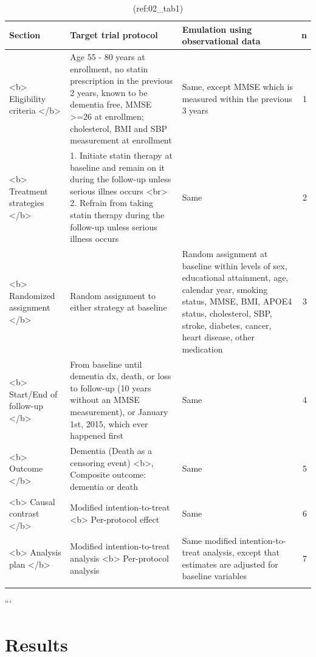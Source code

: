 \documentclass[
]{book}
\begin{document}
\begin{longtable}[t]{lllr}
\caption{\label{tab:unnamed-chunk-1}(ref:02_tab1)}\\
\toprule{}
Section & Target trial protocol & Emulation using observational data & n\\
\midrule{}
<b> Eligibility criteria </b> & Age 55 - 80 years at enrollment, no statin prescription in the previous 2 years, known to be dementia free, MMSE >=26 at enrollmen; cholesterol, BMI and SBP measurement at enrollment & Same, except MMSE which is measured within the previous 3 years & 1\\
<b> Treatment strategies  </b> & 1. Initiate statin therapy at baseline and remain on it during the follow-up unless serious illnes occurs <br>
     2. Refrain from taking statin therapy during the follow-up unless serious illness occurs & Same & 2\\
<b> Randomized assignment </b> & Random assignment to either strategy at baseline & Random assignment at baseline within levels of sex, educational attainment, age, calendar year, smoking status, MMSE, BMI, APOE4 status, cholesterol, SBP, stroke, diabetes, cancer, heart disease, other medication & 3\\
<b> Start/End of follow-up </b> & From baseline until dementia dx, death, or loss to follow-up (10 years without an MMSE measurement), or January 1st, 2015, which ever happened first & Same & 4\\
<b> Outcome  </b> & Dementia (Death as a censoring event) <b>,
     Composite outcome: dementia or death & Same & 5\\
\addlinespace
<b> Causal contrast  </b> & Modified intention-to-treat <b>
    Per-protocol effect & Same & 6\\
<b> Analysis plan  </b> & Modified intention-to-treat analysis <b>
    Per-protocol analysis & Same modified intention-to-treat analysis, except that estimates are adjusted for baseline variables & 7\\
\bottomrule{}
\end{longtable}
\endgroup{}

```

\hypertarget{results}{%
\section{Results}\label{results}}
\end{document}
